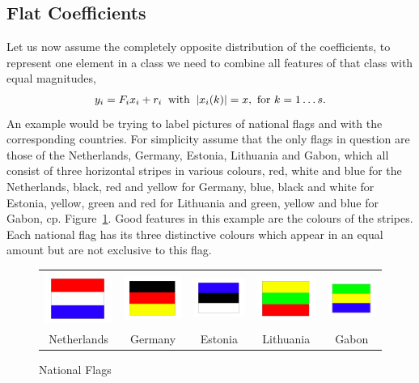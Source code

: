 \documentclass[11pt]{article}
\begin{document}
\subsection{Flat Coefficients}
Let us now assume the completely opposite distribution of the coefficients, \ie to represent one element in a class we need to combine all features of that class with equal magnitudes, \ie
\begin{align}
{y}_i= {F}_i x_i + r_i \: \mbox{ with } \: |x_i(k)| = x, \mbox{ for }k=1\ldots {s}.
\end{align}
An example would be trying to label pictures of national flags and with the corresponding countries. For simplicity assume that the only flags in question are those of the Netherlands, Germany, Estonia, Lithuania and Gabon, which all consist of three horizontal stripes in various colours, \ie red, white and blue for the Netherlands, black, red and yellow for Germany, blue, black and white for Estonia, yellow, green and red for Lithuania and green, yellow and blue for Gabon, cp. Figure~\ref{fig:flags}. Good features in this example are the colours of the stripes. Each national flag has its three distinctive colours which appear in an equal amount but are not exclusive to this flag.

\begin{figure}[htb]
\begin{tabular}{ccccc}
 \includegraphics[width=3cm]{nl.jpg} &
  \includegraphics[width=3cm]{de.jpg} &
   \includegraphics[width=3cm]{es.jpg} &
  \includegraphics[width=3cm]{lt.jpg} &
   \includegraphics[width=3cm]{gb.jpg}\\
   Netherlands&Germany&Estonia&Lithuania&Gabon\\
  \end{tabular}
    \caption{National Flags \label{fig:flags}}
\end{figure}
\end{document}
